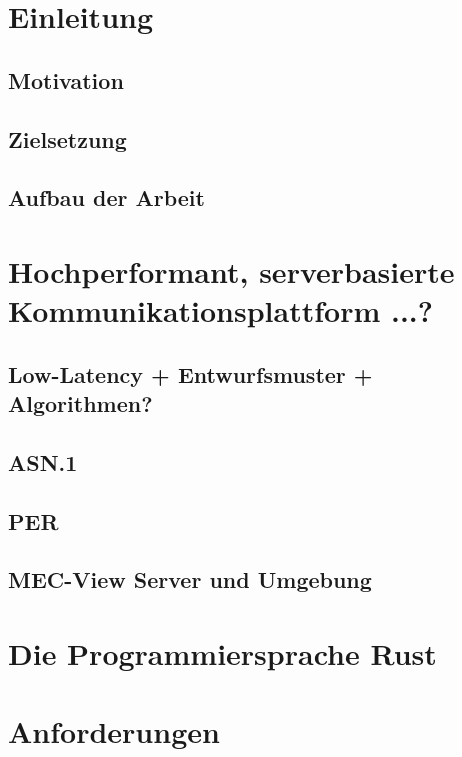\documentclass[11pt]{scrartcl}
\date{\gitAuthorDate}
\begin{document}
	
	
	
	
	\thispagestyle{empty}
	
	\setcounter{page}{0}
	
	\clearpage	
	\hypersetup{allcolors=black}
	\tableofcontents
	\hypersetup{allcolors=blue}
	\newpage
	
	
	\setcounter{page}{1}
	\section{Einleitung}
	\subsection{Motivation}
	\subsection{Zielsetzung}
	\subsection{Aufbau der Arbeit}
	
	\section{Hochperformant, serverbasierte Kommunikationsplattform ...?}
		\subsection{Low-Latency + Entwurfsmuster + Algorithmen?}
		\subsection{ASN.1}
		\subsection{PER}
		\subsection{MEC-View Server und Umgebung}
		
	\section{Die Programmiersprache Rust}
		

	
	\section{Anforderungen}
\end{document}
